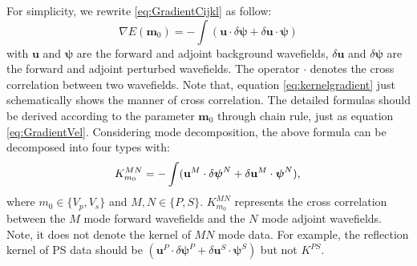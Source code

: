 For simplicity, we rewrite \eqref{eq:GradientCijkl} as follow:
\begin{equation}
    \nabla E(
    \mathbf{m}_0)=-\int(
    \mathbf{u}\cdot\delta \boldsymbol{\psi}
    +\delta
    \mathbf{u}\cdot{\boldsymbol{\psi}})
    \label{eq:kernelgradient} 
\end{equation} 
with $\mathbf{u}$ and $\boldsymbol{\psi}$ are the forward and adjoint background wavefields,
$\delta\mathbf{u}$ and $\delta \boldsymbol{\psi}$ are the forward and adjoint perturbed wavefields.
The operator $\cdot$ denotes the cross correlation between two wavefields. 
Note that, equation \eqref{eq:kernelgradient} just schematically shows the manner of cross correlation. 
The detailed formulas should be derived according to the parameter $\mathbf{m}_0$ through chain rule, just as equation \eqref{eq:GradientVel}.
Considering mode decomposition, the above formula can be decomposed into four types with:
\begin{equation}
    K_{m_0}^{MN}     
    =-\int(\mathbf{u}^M\cdot\delta \boldsymbol{\psi}^N
    +\delta  \mathbf{u}^M\cdot\boldsymbol{\psi}^N),\\
    \label{eq:decompkernel} 
\end{equation}
where $m_0\in\{V_p, V_s\}$ and $M,N\in\{P,S\}$.
$K_{m_0}^{MN}$ represents the cross correlation between the $M$ mode forward wavefields and the 
$N$ mode adjoint wavefields. Note, it does not denote the kernel of $MN$ mode data. For example, the reflection 
kernel of PS data should be $(\mathbf{u}^P\cdot\delta \boldsymbol{\psi}^P +\delta
\mathbf{u}^S\cdot\boldsymbol{\psi}^S)$ but not $K^{PS}$.

